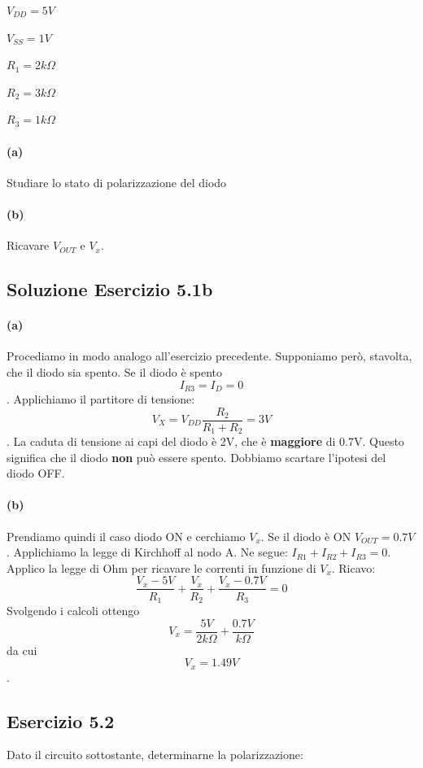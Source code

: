 \documentclass[\main/main.tex]{subfiles}
\begin{document}
\begin{center}
  $V_{DD}=5V$

  $V_{SS}=1V$

  $R_1=2k\Omega$

  $R_2=3k\Omega$

  $R_3=1k\Omega$

\end{center}

\paragraph{(a)} Studiare lo stato di polarizzazione del diodo \paragraph{(b)} Ricavare $V_{OUT}$ e $V_x$.

\subsection{Soluzione Esercizio 5.1b}
\paragraph{(a)}
Procediamo in modo analogo all'esercizio precedente.
Supponiamo però, stavolta, che il diodo sia spento.
Se il diodo è spento \[I_{R3}=I_D=0\].
Applichiamo il partitore di tensione:
\[V_{X} = V_{DD}\frac{R_2}{R_1+R_2} = 3V\].
La caduta di tensione ai capi del diodo è 2V, che è \textbf{maggiore} di 0.7V.
Questo significa che il diodo \textbf{non} può essere spento.
Dobbiamo scartare l'ipotesi del diodo OFF.

\paragraph{(b)}
Prendiamo quindi il caso diodo ON e cerchiamo $V_x$.
Se il diodo è ON $V_{OUT}=0.7V$.
Applichiamo la legge di Kirchhoff al nodo A. Ne segue: $I_{R1}+I_{R2}+I_{R3}=0$.
Applico la legge di Ohm per ricavare le correnti in funzione di $V_x$.
Ricavo:
\[\frac{V_x-5V}{R_1} + \frac{V_x}{R_2} + \frac{V_x-0.7V}{R_3} =0 \]
Svolgendo i calcoli ottengo \[V_x = \frac{5V}{2k\Omega} + \frac{0.7V}{k\Omega} \]
da cui \[V_x=1.49V\].

\subsection{Esercizio 5.2}
Dato il circuito sottostante, determinarne la polarizzazione:
\end{document}
